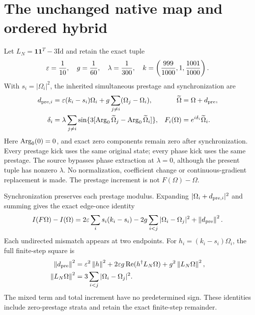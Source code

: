 \section{The unchanged native map and ordered hybrid}\label{sec:hybrid}
Let $L_N=\mathbf1\mathbf1^T-3\mathrm{Id}$ and retain the exact tuple
\begin{equation}\label{eq:tuple}
 \varepsilon=\frac1{10},\quad g=\frac1{60},\quad\lambda=\frac1{300},\quad
 k=\left(\frac{999}{1000},1,\frac{1001}{1000}\right).
\end{equation}
With $s_i=|\Omega_i|^2$, the inherited simultaneous prestage and synchronization are~\cite{intensity,nativecode}
\begin{align}
 d_{{\rm pre},i}&=\varepsilon(k_i-s_i)\Omega_i+g\sum_{j\ne i}(\Omega_j-\Omega_i),
 &\widetilde\Omega&=\Omega+d_{\rm pre},\label{eq:prestage}\\
 \delta_i&=\lambda\sum_{j\ne i}\sin\{3[\operatorname{Arg}_0\widetilde\Omega_j-\operatorname{Arg}_0\widetilde\Omega_i]\},
 &F_i(\Omega)&=e^{i\delta_i}\widetilde\Omega_i.\label{eq:nativemap}
\end{align}
Here $\operatorname{Arg}_0(0)=0$, and exact zero components remain zero after synchronization. Every prestage kick uses the same original state; every phase kick uses the same prestage. The source bypasses phase extraction at $\lambda=0$, although the present tuple has nonzero $\lambda$. No normalization, coefficient change or continuous-gradient replacement is made. The prestage increment is not $F(\Omega)-\Omega$.

Synchronization preserves each prestage modulus. Expanding $|\Omega_i+d_{{\rm pre},i}|^2$ and summing gives the exact edge-once identity
\begin{equation}\label{eq:nativeintensity}
 I(F\Omega)-I(\Omega)
 =2\varepsilon\sum_i s_i(k_i-s_i)-2g\sum_{i<j}|\Omega_i-\Omega_j|^2
 +\left\|d_{\rm pre}\right\|^2.
\end{equation}
Each undirected mismatch appears at two endpoints. For $h_i=(k_i-s_i)\Omega_i$, the full finite-step square is
\begin{align}
 \left\|d_{\rm pre}\right\|^2&=\varepsilon^2\left\|h\right\|^2
 +2\varepsilon g\operatorname{Re}(h^\dagger L_N\Omega)+g^2\left\|L_N\Omega\right\|^2,\label{eq:fullsquare}\\
 \left\|L_N\Omega\right\|^2&=3\sum_{i<j}|\Omega_i-\Omega_j|^2.\label{eq:graphsquare}
\end{align}
The mixed term and total increment have no predetermined sign. These identities include zero-prestage strata and retain the exact finite-step remainder.

